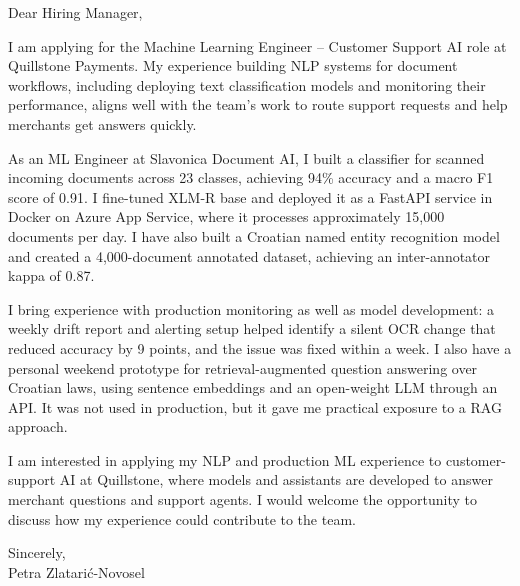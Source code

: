 \documentclass[11pt,a4paper]{article}
\begin{document}
\color{primarycolor}
Dear Hiring Manager,

I am applying for the Machine Learning Engineer – Customer Support AI role at Quillstone Payments. My experience building NLP systems for document workflows, including deploying text classification models and monitoring their performance, aligns well with the team’s work to route support requests and help merchants get answers quickly.

As an ML Engineer at Slavonica Document AI, I built a classifier for scanned incoming documents across 23 classes, achieving 94\% accuracy and a macro F1 score of 0.91. I fine-tuned XLM-R base and deployed it as a FastAPI service in Docker on Azure App Service, where it processes approximately 15,000 documents per day. I have also built a Croatian named entity recognition model and created a 4,000-document annotated dataset, achieving an inter-annotator kappa of 0.87.

I bring experience with production monitoring as well as model development: a weekly drift report and alerting setup helped identify a silent OCR change that reduced accuracy by 9 points, and the issue was fixed within a week. I also have a personal weekend prototype for retrieval-augmented question answering over Croatian laws, using sentence embeddings and an open-weight LLM through an API. It was not used in production, but it gave me practical exposure to a RAG approach.

I am interested in applying my NLP and production ML experience to customer-support AI at Quillstone, where models and assistants are developed to answer merchant questions and support agents. I would welcome the opportunity to discuss how my experience could contribute to the team.

Sincerely,\\
Petra Zlatarić-Novosel
\end{document}
